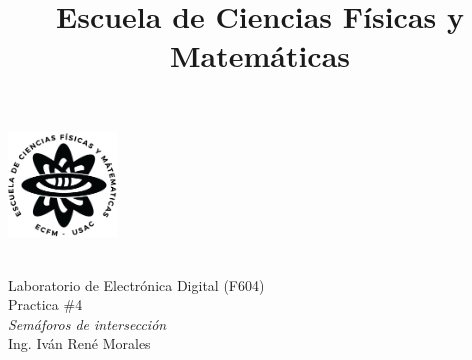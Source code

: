 \documentclass[10pt, letterpaper]{article} %
\title{Escuela de Ciencias Físicas y Matemáticas}
\makeatletter
\let\thetitle\@title
\newcommand{\hoofding}[5]{ %
\begin{flushleft}
\includegraphics[height=2.8cm]{images/logoecfm.png} %
\end{flushleft}
\vspace{-3cm} %
\hspace{4cm} 
\parbox{15cm}{ #1\\#2\\#3\\#4\\#5} %
{\parindent=0pt \hrulefill} 
\vspace{1mm}}
\makeatother
\begin{document}
\setlength{\parindent}{1cm}%

\hoofding {\thetitle}{Laboratorio de Electrónica Digital (F604)}{Practica $\#$4}
{\textit{Semáforos de intersección}}{Ing. Iván René Morales}%


%
%
\end{document}
